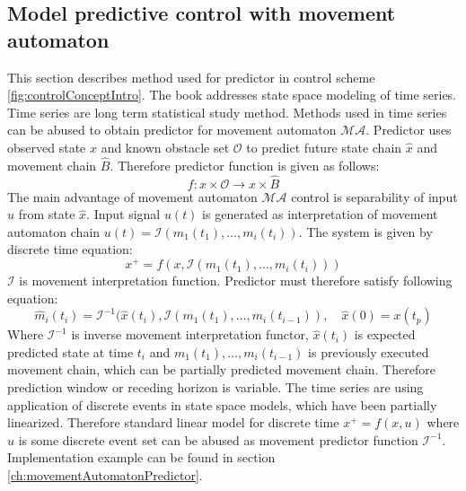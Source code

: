 \subsection{Model predictive control with movement automaton}
\noindent This section describes method used for predictor in control scheme \ref{fig:controlConceptIntro}. The book \cite{durbin2012time} addresses state space modeling of time series. Time series are long term statistical study method. Methods used in time series can be abused to obtain predictor for movement automaton $\mathscr{MA}$. Predictor uses observed state $x$ and known obstacle set $\mathscr{O}$ to predict future state chain $\hat{x}$ and movement chain $\hat{B}$. Therefore predictor function is given as follows:
\begin{equation}\label{eq:predictorGlobalForm}
    f:x\times \mathscr{O}\to \hat{x}\times\hat{B}
\end{equation}
\noindent The main advantage of movement automaton $\mathscr{MA}$ control is separability of input $u$ from state $\hat{x}$. Input signal $u(t)$ is generated as interpretation of movement automaton chain $u(t)=\mathscr{I}(m_1(t_1),\dots,m_i(t_i))$. The system is given by discrete time equation:
\begin{equation}
    x^+= f(x,\mathscr{I}(m_1(t_1),\dots,m_i(t_i)))
\end{equation}
\noindent $\mathscr{I}$ is movement interpretation function. Predictor must therefore satisfy following equation:
\begin{equation}
    \hat{m}_i(t_i) =\mathscr{I}^{-1}(\hat{x}(t_i),\mathscr{I}(m_1(t_1),\dots,m_i(t_{i-1})),\quad \hat{x}(0) = x(t_p)
\end{equation}
\noindent Where $\mathscr{I}^{-1}$ is inverse movement interpretation functor, $\hat{x}(t_i)$ is expected predicted state at time $t_i$ and $m_1(t_1),\dots,m_i(t_{i-1})$ is previously executed movement chain, which can be partially predicted movement chain. Therefore prediction window or receding horizon is variable. The time series are using application of discrete events in state space models, which have been partially linearized. Therefore standard linear model for discrete time $x^+=f(x,u)$ where $u$ is some discrete event set can be abused as movement predictor function  $\mathscr{I}^{-1}$. Implementation example can be found in section \ref{ch:movementAutomatonPredictor}.

